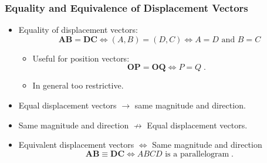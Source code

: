 \begin{frame}
 \frametitle{Equality and Equivalence of Displacement Vectors}

  \begin{itemize}
   \item Equality of displacement vectors: \pause
    $$\textbf{AB} = \textbf{DC} \Longleftrightarrow (A,B) = (D,C) \Longleftrightarrow A=D \text{ and } B=C$$
    \begin{itemize}
      \item Useful for position vectors:
      $$\textbf{OP} = \textbf{OQ} \Longleftrightarrow P=Q\; .$$
      \item In general too restrictive. \pause
    \end{itemize}
    \item Equal displacement vectors $\rightarrow$ same magnitude and direction.
    \item Same magnitude and direction $\not\rightarrow$ Equal displacement vectors. \pause
    \item  Equivalent displacement vectors $\Leftrightarrow$ Same magnitude and direction
    $$\textbf{AB} \equiv \textbf{DC} \Longleftrightarrow ABCD \text{ is a parallelogram}\;.$$
  \end{itemize}

\end{frame}